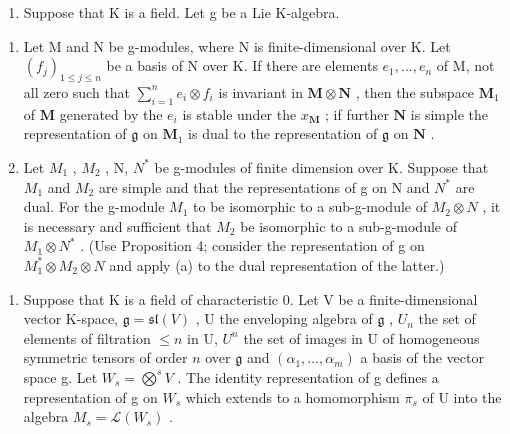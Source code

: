 \begin{enumerate}
\def\labelenumi{\arabic{enumi}.}
\setcounter{enumi}{3}
\tightlist
\item
  Suppose that K is a field. Let g be a Lie K-algebra.
\end{enumerate}

\begin{enumerate}
\def\labelenumi{(\alph{enumi})}
\item
  Let M and N be g-modules, where N is finite-dimensional over K. Let \((f_{j})_{1 \leqslant j \leqslant n}\) be a basis of N over K. If there are elements \(e_{1}, \ldots, e_{n}\) of M, not all zero such that \(\sum_{i=1}^{n} e_i \otimes f_i\) is invariant in \(\mathbf{M} \otimes \mathbf{N}\) , then the subspace \(\mathbf{M}_1\) of \(\mathbf{M}\) generated by the \(e_i\) is stable under the \(x_{\mathbf{M}}\) ; if further \(\mathbf{N}\) is simple the representation of \(\mathfrak{g}\) on \(\mathbf{M}_1\) is dual to the representation of \(\mathfrak{g}\) on \(\mathbf{N}\) .
\item
  Let \(M_{1}\) , \(M_{2}\) , N, \(N^{*}\) be g-modules of finite dimension over K. Suppose that \(M_{1}\) and \(M_{2}\) are simple and that the representations of g on N and \(N^{*}\) are dual. For the g-module \(M_{1}\) to be isomorphic to a sub-g-module of \(M_{2} \otimes N\) , it is necessary and sufficient that \(M_{2}\) be isomorphic to a sub-g-module of \(M_{1} \otimes N^{*}\) . (Use Proposition 4; consider the representation of g on \(M_{1}^{*} \otimes M_{2} \otimes N\) and apply (a) to the dual representation of the latter.)
\end{enumerate}

\begin{enumerate}
\def\labelenumi{\arabic{enumi}.}
\setcounter{enumi}{4}
\tightlist
\item
  Suppose that K is a field of characteristic 0. Let V be a finite-dimensional vector K-space, \(\mathfrak{g} = \mathfrak{sl}(V)\) , U the enveloping algebra of \(\mathfrak{g}\) , \(U_n\) the set of elements of filtration \(\leqslant n\) in U, \(U^n\) the set of images in U of homogeneous symmetric tensors of order \(n\) over \(\mathfrak{g}\) and \((\alpha_1, \ldots, \alpha_m)\) a basis of the vector space g. Let \(W_{s} = \bigotimes^{s} V\) . The identity representation of g defines a representation of g on \(W_{s}\) which extends to a homomorphism \(\pi_s\) of U into the algebra \(M_s = \mathcal{L}(W_s)\) .
\end{enumerate}

